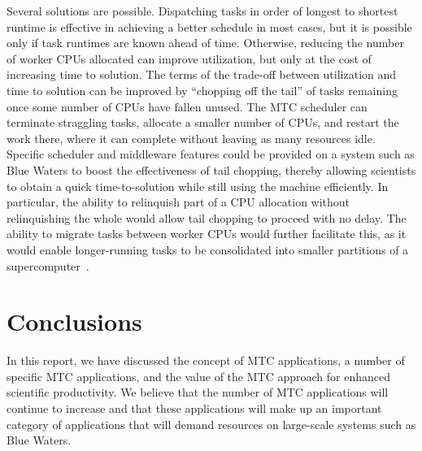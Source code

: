 \documentclass[10pt,letterpaper]{article}
\begin{document}
\begin{itemize}
\begin{itemize}
    Several solutions are possible.  Dispatching tasks in order of
    longest to shortest runtime is effective in achieving a better
    schedule in most cases, but it is possible only if task runtimes are
    known ahead of time.  Otherwise, reducing the number of worker
    CPUs allocated can improve utilization, but only at the cost of
    increasing time to solution.  The terms of the trade-off between
    utilization and time to solution can be improved by ``chopping off
    the tail'' of tasks remaining once some number of CPUs have fallen
    unused.  The MTC scheduler can terminate straggling tasks,
    allocate a smaller number of CPUs, and restart the work there,
    where it can complete without leaving as many resources idle.
    Specific scheduler and middleware features could be provided on a
    system such as Blue Waters to boost the effectiveness of tail chopping,
    thereby allowing scientists to obtain a quick time-to-solution
    while still using the machine efficiently. In
    particular, the ability to relinquish part of a CPU allocation
    without relinquishing the whole would allow tail chopping to
    proceed with no delay.  The ability to migrate tasks between
    worker CPUs would further facilitate this, as it would enable
    longer-running tasks to be consolidated into smaller partitions of
    a supercomputer~\cite{armstrong-10}.

  \end{itemize}

\end{itemize}

\section{Conclusions\label{sec:conclusions}}

In this report, we have discussed the concept of MTC applications, a number of
specific MTC applications, and the value of the MTC approach for
enhanced scientific productivity.  We believe that
the number of MTC applications will continue to increase and
that these applications will make up an important category of applications that will demand resources
on large-scale systems such as Blue Waters.
\end{document}
